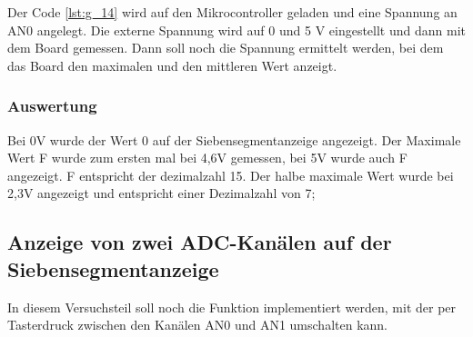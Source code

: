\documentclass[12pt,a4paper]{article}
\begin{document}
Der Code \ref{lst:g_14} wird auf den Mikrocontroller geladen und eine Spannung an AN0 angelegt. Die externe Spannung wird auf 0 und 5 V eingestellt und dann mit dem Board gemessen. Dann soll noch die Spannung ermittelt werden, bei dem das  Board den maximalen und den mittleren Wert anzeigt.

\subsubsection*{Auswertung}

Bei 0V wurde der Wert 0 auf der Siebensegmentanzeige angezeigt. Der Maximale Wert F wurde zum ersten mal bei 4,6V gemessen, bei 5V wurde auch F angezeigt. F entspricht der dezimalzahl 15. Der halbe maximale Wert wurde bei 2,3V angezeigt und entspricht einer Dezimalzahl von 7;

\subsection{Anzeige von zwei ADC-Kanälen auf der Siebensegmentanzeige}

In diesem Versuchsteil soll noch die Funktion implementiert werden, mit der per Tasterdruck zwischen den Kanälen AN0 und AN1 umschalten kann.
\end{document}
